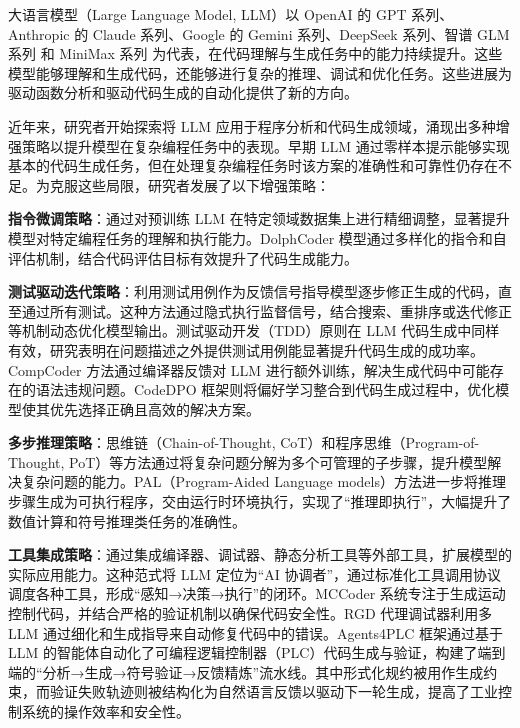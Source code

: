 大语言模型（Large Language Model, LLM）以 OpenAI 的 GPT 系列\cite{openai2023gpt4}、Anthropic 的 Claude 系列\cite{claude35sonnet}、Google 的 Gemini 系列\cite{gemini3}、DeepSeek 系列\cite{deepseekr1}、智谱 GLM 系列\cite{glm5} 和 MiniMax 系列\cite{minmax27} 为代表，在代码理解与生成任务中的能力持续提升。这些模型能够理解和生成代码，还能够进行复杂的推理、调试和优化任务。这些进展为驱动函数分析和驱动代码生成的自动化提供了新的方向。

近年来，研究者开始探索将 LLM 应用于程序分析和代码生成领域，涌现出多种增强策略以提升模型在复杂编程任务中的表现。早期 LLM 通过零样本提示能够实现基本的代码生成任务，但在处理复杂编程任务时该方案的准确性和可靠性仍存在不足。为克服这些局限，研究者发展了以下增强策略：

\textbf{指令微调策略}：通过对预训练 LLM 在特定领域数据集上进行精细调整，显著提升模型对特定编程任务的理解和执行能力\cite{wei2022finetuned}。DolphCoder 模型通过多样化的指令和自评估机制，结合代码评估目标有效提升了代码生成能力\cite{dolphcoder2024}。

\textbf{测试驱动迭代策略}：利用测试用例作为反馈信号指导模型逐步修正生成的代码，直至通过所有测试。这种方法通过隐式执行监督信号，结合搜索、重排序或迭代修正等机制动态优化模型输出\cite{chen2023teaching}。测试驱动开发（TDD）原则在 LLM 代码生成中同样有效，研究表明在问题描述之外提供测试用例能显著提升代码生成的成功率\cite{mathews2024test}。CompCoder 方法通过编译器反馈对 LLM 进行额外训练，解决生成代码中可能存在的语法违规问题\cite{rlcf2024}。CodeDPO 框架则将偏好学习整合到代码生成过程中，优化模型使其优先选择正确且高效的解决方案\cite{codedpo2024}。

\textbf{多步推理策略}：思维链（Chain-of-Thought, CoT）和程序思维（Program-of-Thought, PoT）等方法通过将复杂问题分解为多个可管理的子步骤，提升模型解决复杂问题的能力\cite{wei2022cot}。PAL（Program-Aided Language models）方法进一步将推理步骤生成为可执行程序，交由运行时环境执行，实现了“推理即执行”，大幅提升了数值计算和符号推理类任务的准确性\cite{gao2023pal}。

\textbf{工具集成策略}：通过集成编译器、调试器、静态分析工具等外部工具，扩展模型的实际应用能力。这种范式将 LLM 定位为“AI 协调者”，通过标准化工具调用协议调度各种工具，形成“感知→决策→执行”的闭环\cite{schick2023toolformer}。MCCoder 系统专注于生成运动控制代码，并结合严格的验证机制以确保代码安全性\cite{mccoder2024}。RGD 代理调试器利用多 LLM 通过细化和生成指导来自动修复代码中的错误\cite{rgd2024}。Agents4PLC 框架通过基于 LLM 的智能体自动化了可编程逻辑控制器（PLC）代码生成与验证，构建了端到端的“分析→生成→符号验证→反馈精炼”流水线\cite{agents4plc2024}。其中形式化规约被用作生成约束，而验证失败轨迹则被结构化为自然语言反馈以驱动下一轮生成，提高了工业控制系统的操作效率和安全性。

